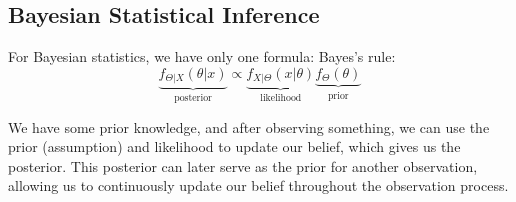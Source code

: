 \subsection{Bayesian Statistical Inference}
For Bayesian statistics, we have only one formula: Bayes’s rule: 
\[
  \underbrace{f_{\Theta \vert X} (\theta \vert x)}_{\text{posterior}} \propto \underbrace{f_{X \vert \Theta} (x \vert \theta)}_{\text{likelihood}} \underbrace{f_{\Theta} (\theta)}_{\text{prior}}
\]

We have some prior knowledge, and after observing something, we can use the prior (assumption) and likelihood to update our belief, which gives us the posterior. This posterior can later serve as the prior for another observation, allowing us to continuously update our belief throughout the observation process.

